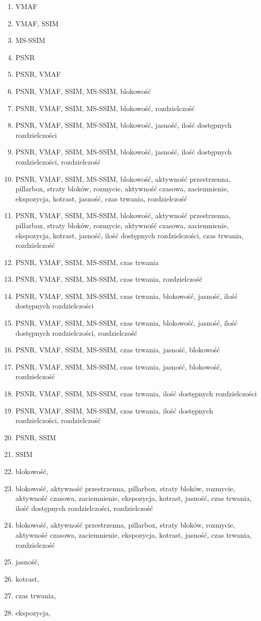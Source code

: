 \begin{enumerate}
\itemsep-0.5em 
\item VMAF
\item VMAF, SSIM
\item MS-SSIM
\item PSNR
\item PSNR, VMAF
\item PSNR, VMAF, SSIM, MS-SSIM, blokowość
\item PSNR, VMAF, SSIM, MS-SSIM, blokowość, rozdzielczość
\item PSNR, VMAF, SSIM, MS-SSIM, blokowość, jasność, ilość dostępnych rozdzielczości
\item PSNR, VMAF, SSIM, MS-SSIM, blokowość, jasność, ilość dostępnych rozdzielczości, rozdzielczość
\item PSNR, VMAF, SSIM, MS-SSIM, blokowość, aktywność przestrzenna, pillarbox, straty bloków, rozmycie, aktywność czasowa, zaciemnienie, ekspozycja, kotrast, jasność, czas trwania, rozdzielczość
\item PSNR, VMAF, SSIM, MS-SSIM, blokowość, aktywność przestrzenna, pillarbox, straty bloków, rozmycie, aktywność czasowa, zaciemnienie, ekspozycja, kotrast, jasność, ilość dostępnych rozdzielczości, czas trwania, rozdzielczość
\item PSNR, VMAF, SSIM, MS-SSIM, czas trwania
\item PSNR, VMAF, SSIM, MS-SSIM, czas trwania, rozdzielczość
\item PSNR, VMAF, SSIM, MS-SSIM, czas trwania, blokowość, jasność, ilość dostępnych rozdzielczości
\item PSNR, VMAF, SSIM, MS-SSIM, czas trwania, blokowość, jasność, ilość dostępnych rozdzielczości, rozdzielczość
\item PSNR, VMAF, SSIM, MS-SSIM, czas trwania, jasność, blokowość
\item PSNR, VMAF, SSIM, MS-SSIM, czas trwania, jasność, blokowość, rozdzielczość
\item PSNR, VMAF, SSIM, MS-SSIM, czas trwania, ilość dostępnych rozdzielczości
\item PSNR, VMAF, SSIM, MS-SSIM, czas trwania, ilość dostępnych rozdzielczości, rozdzielczość
\item PSNR, SSIM
\item SSIM
\item blokowość,
\item blokowość, aktywność przestrzenna, pillarbox, straty bloków, rozmycie, aktywność czasowa, zaciemnienie, ekspozycja, kotrast, jasność, czas trwania, ilość dostępnych rozdzielczości, rozdzielczość
\item blokowość, aktywność przestrzenna, pillarbox, straty bloków, rozmycie, aktywność czasowa, zaciemnienie, ekspozycja, kotrast, jasność, czas trwania, rozdzielczość
\item jasność,
\item kotrast,
\item czas trwania,
\item ekspozycja,
\end{enumerate}

